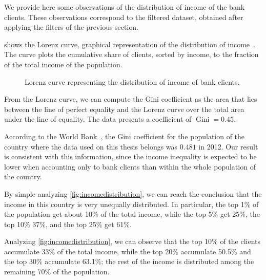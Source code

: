 We provide here some observations of the distribution of income of the bank clients. These observations correspond to the filtered dataset, obtained after applying the filters of the previous section.

 shows the Lorenz curve, graphical representation of the distribution of income~\cite{satchell1987}. The curve plots the cumulative share of clients, sorted by income, to the fraction of the total income of the population.

\begin{figure}
\centering
{}
\caption{Lorenz curve representing the distribution of income of bank clients.}
\label{fig:lorenz}
\end{figure}

From the Lorenz curve, we can compute the Gini coefficient as the area that lies between the line of perfect equality and the Lorenz curve over the total area under the line of equality. The data presents a coefficient of $\operatorname{Gini} = 0.45$.

According to the World Bank~\cite{world_bank}, the Gini coefficient for the population of the country where the data used on this thesis belongs was $0.481$ in 2012. Our result is consistent with this information, since the income inequality is expected to be lower when accounting only to bank clients than within the whole population of the country.

By simple analyzing \cref{fig:incomedistribution}, we can reach the conclusion that the income in this country is very unequally distributed. In particular, the top 1\% of the population get about 10\% of the total income, while the top 5\% get 25\%, the top 10\% 37\%, and the top 25\% get 61\%.

Analyzing \cref{fig:incomedistribution}, we can observe that the top 10\% of the clients accumulate 33\% of the total income, while the top 20\% accumulate 50.5\% and the top 30\% accumulate 63.1\%; the rest of the income is distributed among the remaining 70\% of the population.
